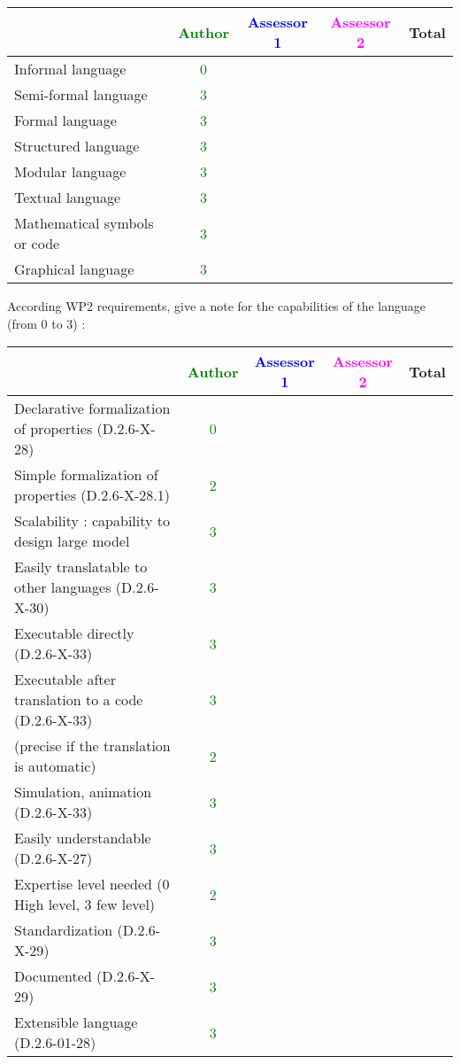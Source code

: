 \begin{author_comment}
\begin{tabular}{|l | c | c | c | c|}
\hline
& \textcolor{green}{Author} & \textcolor{blue}{Assessor 1} & \textcolor{magenta}{Assessor 2} & Total \\
\hline 
Informal language & \textcolor{green}{0} & & &  \\
\hline 
Semi-formal language & \textcolor{green}{3} & & &  \\
\hline
Formal language & \textcolor{green}{3} & & &  \\
\hline
Structured language & \textcolor{green}{3} & & & \\
\hline
Modular language & \textcolor{green}{3} & & & \\
\hline
Textual language & \textcolor{green}{3} & & & \\
\hline
Mathematical symbols or code & \textcolor{green}{3} & & & \\
\hline
Graphical language & \textcolor{green}{3} & & & \\
\hline
\end{tabular}
According WP2 requirements, give a note for the capabilities of the language (from 0 to 3) :

\begin{tabular}{|l | c | c | c | c|}
\hline
& \textcolor{green}{Author} & \textcolor{blue}{Assessor 1} & \textcolor{magenta}{Assessor 2} & Total \\
\hline
Declarative formalization of properties (D.2.6-X-28) & \textcolor{green}{0} & & & \\
\hline
Simple formalization of properties (D.2.6-X-28.1) & \textcolor{green}{2} & & & \\
\hline
Scalability : capability to design large model & \textcolor{green}{3} & & & \\
\hline
Easily translatable to other languages (D.2.6-X-30) & \textcolor{green}{3} & & & \\
\hline
Executable directly (D.2.6-X-33) & \textcolor{green}{3} & & & \\
\hline
Executable after translation to a code (D.2.6-X-33) & \textcolor{green}{3} & & & \\
(precise if the translation is automatic) & \textcolor{green}{2} & & & \\
\hline
Simulation, animation (D.2.6-X-33) & \textcolor{green}{3} & & & \\
\hline
Easily understandable (D.2.6-X-27) & \textcolor{green}{3} & & & \\
\hline
Expertise level needed (0 High level, 3 few level) & \textcolor{green}{2} & & & \\
\hline
Standardization (D.2.6-X-29) & \textcolor{green}{3} & & & \\
\hline
Documented (D.2.6-X-29) & \textcolor{green}{3} & & & \\
\hline
Extensible language (D.2.6-01-28) & \textcolor{green}{3} & & & \\
\hline
\end{tabular}



\end{author_comment}
